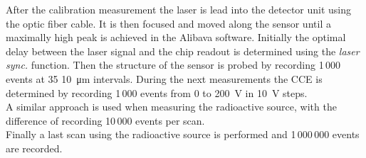 After the calibration measurement the laser is lead into the detector unit using the optic fiber cable. It is then focused and moved along the sensor until a maximally high peak is achieved in the Alibava software. Initially the optimal delay between the laser signal and the chip readout is determined using the \textit{laser sync.} function. Then the structure of the sensor is probed by recording 1\,000 events at 35 \qty{10}{\micro\meter} intervals. During the next measurements the CCE is determined by recording 1\,000 events from 0 to \qty{200}{\volt} in \qty{10}{\volt} steps.\\

A similar approach is used when measuring the radioactive source, with the difference of recording 10\,000 events per scan. \\

Finally a last scan using the radioactive source is performed and 1\,000\,000 events are recorded.